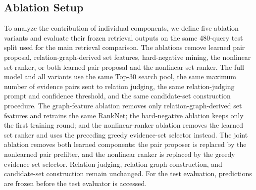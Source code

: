 \subsection{Ablation Setup}

To analyze the contribution of individual components, we define five ablation variants and evaluate their frozen retrieval outputs on the same 480-query test split used for the main retrieval comparison. The ablations remove learned pair proposal, relation-graph-derived set features, hard-negative mining, the nonlinear set ranker, or both learned pair proposal and the nonlinear set ranker. The full model and all variants use the same Top-30 search pool, the same maximum number of evidence pairs sent to relation judging, the same relation-judging prompt and confidence threshold, and the same candidate-set construction procedure. The graph-feature ablation removes only relation-graph-derived set features and retrains the same RankNet; the hard-negative ablation keeps only the first training round; and the nonlinear-ranker ablation removes the learned set ranker and uses the preceding greedy evidence-set selector instead. The joint ablation removes both learned components: the pair proposer is replaced by the nonlearned pair prefilter, and the nonlinear ranker is replaced by the greedy evidence-set selector. Relation judging, relation-graph construction, and candidate-set construction remain unchanged. For the test evaluation, predictions are frozen before the test evaluator is accessed.
